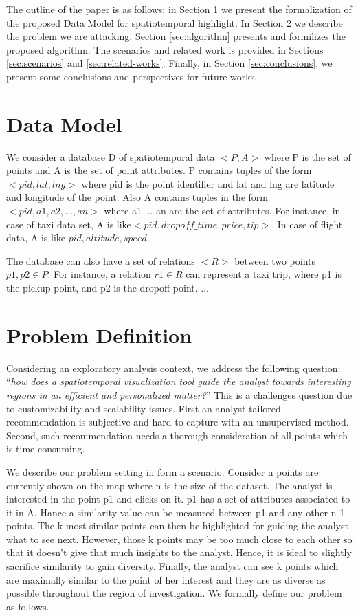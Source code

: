 \documentclass{sig-alternate-05-2015}
\begin{document}
The outline of the paper is as follows: in Section \ref{sec:data-model} we
present the formalization of the proposed Data Model for spatiotemporal
highlight. In Section \ref{sec:problem-definition} we describe the problem we
are attacking. Section \ref{sec:algorithm} presents and formilizes the proposed
algorithm. The scenarios and related work is provided in Sections \ref{sec:scenarios} and
\ref{sec:related-works}. Finally, in Section \ref{sec:conclusions}, we present 
some conclusions and perspectives for future works.

\section{Data Model}\label{sec:data-model}
We consider a database D of spatiotemporal data $<P,A>$ where P is the set of
points and A is the set of point attributes. P contains tuples of the form
$<pid, lat, lng>$ where pid is the point identifier and lat and lng are latitude
and longitude of the point. Also A contains tuples in the form $<pid, a1,
a2,..., an>$ where a1 ... an are the set of attributes. For instance, in case of
taxi data set, A is like$< pid, dropoff\_time, price, tip>$. In case of flight data, A is like $pid, altitude, speed$.

The database can also have a set of relations $<R>$ between two points $p1,p2
\in P$. For instance,  a relation $r1 \in R$ can represent a taxi trip, where p1
is the pickup point, and p2 is the dropoff point.    
...
\section{Problem Definition}\label{sec:problem-definition}

Considering an exploratory analysis context, we address the following question:
``\textit{how does a spatiotemporal visualization tool guide the analyst towards
interesting regions in an efficient and personalized matter?}'' This is a
challenges question due to customizability and scalability issues. First an
analyst-tailored recommendation is subjective and hard to capture with an
unsupervised method. Second, such recommendation needs a thorough consideration
of all points which is time-consuming.       

We describe our problem setting in form a scenario. Consider n points are
currently shown on the map where n is the size of the dataset. The analyst is
interested in the point p1 and clicks on it. p1 has a set of attributes
associated to it in A. Hance a similarity value can be measured between p1 and
any other n-1 points. The k-most similar points can then be highlighted for
guiding the analyst what to see next. However, those k points may be too much
close to each other so that it doesn't give that much insights to the analyst.
Hence, it is ideal to slightly sacrifice similarity to gain diversity. Finally,
the analyst can see k points which are maximally similar to the point of her
interest and they are as diverse as possible throughout the region of
investigation. We formally define our problem as follows.            
\end{document}
